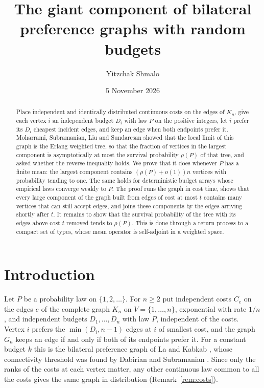 \documentclass[11pt]{amsart}
\title[The giant of bilateral preference graphs]{The giant component of bilateral preference graphs with random budgets}
\author{Yitzchak Shmalo}
\date{5 November 2026}
\theoremstyle{remark}
\numberwithin{equation}{section}
\newcommand{\1}{\mathbf 1}
\begin{document}
\begin{abstract}
Place independent and identically distributed continuous costs on the edges of $K_n$, give each vertex $i$ an independent budget $D_i$ with law $P$ on the positive integers, let $i$ prefer its $D_i$ cheapest incident edges, and keep an edge when both endpoints prefer it. Moharrami, Subramanian, Liu and Sundaresan showed that the local limit of this graph is the Erlang weighted tree, so that the fraction of vertices in the largest component is asymptotically at most the survival probability $\rho(P)$ of that tree, and asked whether the reverse inequality holds. We prove that it does whenever $P$ has a finite mean: the largest component contains $(\rho(P)+o(1))n$ vertices with probability tending to one. The same holds for deterministic budget arrays whose empirical laws converge weakly to $P$. The proof runs the graph in cost time, shows that every large component of the graph built from edges of cost at most $t$ contains many vertices that can still accept edges, and joins these components by the edges arriving shortly after $t$. It remains to show that the survival probability of the tree with its edges above cost $t$ removed tends to $\rho(P)$. This is done through a return process to a compact set of types, whose mean operator is self-adjoint in a weighted space.
\end{abstract}
\maketitle
\enlargethispage{\baselineskip}

\section{Introduction}\label{sec:intro}

Let $P$ be a probability law on $\{1,2,\dots\}$. For $n\ge2$ put independent costs $C_e$ on the edges $e$ of the complete graph $K_n$ on $V=\{1,\dots,n\}$, exponential with rate $1/n$, and independent budgets $D_1,\dots,D_n$ with law $P$, independent of the costs. Vertex $i$ prefers the $\min(D_i,n-1)$ edges at $i$ of smallest cost, and the graph $G_n$ keeps an edge if and only if both of its endpoints prefer it. For a constant budget $k$ this is the bilateral preference graph of La and Kabkab \cite{LK}, whose connectivity threshold was found by Dabirian and Subramanian \cite{DS}. Since only the ranks of the costs at each vertex matter, any other continuous law common to all the costs gives the same graph in distribution (Remark~\ref{rem:costs}).
\end{document}
